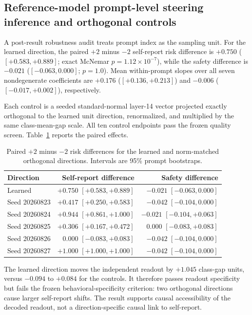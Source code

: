 \documentclass{article}
\begin{document}
\subsection{Reference-model prompt-level steering inference and orthogonal controls}
\label{app:steering-controls}

A post-result robustness audit treats prompt index as the sampling unit.
For the learned direction, the paired $+2$ minus $-2$ self-report risk difference
is $+0.750$ ($[+0.583,+0.889]$; exact McNemar $p=1.12\times10^{-7}$), while the
safety difference is $-0.021$ ($[-0.063,0.000]$; $p=1.0$). Mean within-prompt
slopes over all seven nondegenerate coefficients are $+0.176$
($[+0.136,+0.213]$) and $-0.006$ ($[-0.017,+0.002]$), respectively.

Each control is a seeded standard-normal layer-14 vector projected exactly
orthogonal to the learned unit direction, renormalized, and multiplied by the
same class-mean-gap scale. All ten control endpoints pass the frozen quality
screen. Table~\ref{tab:steering-controls} reports the paired effects.

\begin{table}[h]
  \caption{Paired $+2$ minus $-2$ risk differences for the learned and
  norm-matched orthogonal directions. Intervals are 95\% prompt bootstraps.}
  \label{tab:steering-controls}
  \centering
  \small
  \begin{tabular}{lrr}
    \toprule
    Direction & Self-report difference & Safety difference \\
    \midrule
    Learned & $+0.750$ $[+0.583,+0.889]$ & $-0.021$ $[-0.063,0.000]$ \\
    Seed 20260823 & $+0.417$ $[+0.250,+0.583]$ & $-0.042$ $[-0.104,0.000]$ \\
    Seed 20260824 & $+0.944$ $[+0.861,+1.000]$ & $-0.021$ $[-0.104,+0.063]$ \\
    Seed 20260825 & $+0.306$ $[+0.167,+0.472]$ & $0.000$ $[-0.083,+0.083]$ \\
    Seed 20260826 & $0.000$ $[-0.083,+0.083]$ & $-0.042$ $[-0.104,0.000]$ \\
    Seed 20260827 & $+1.000$ $[+1.000,+1.000]$ & $-0.042$ $[-0.104,0.000]$ \\
    \bottomrule
  \end{tabular}
\end{table}

The learned direction moves the independent readout by $+1.045$ class-gap
units, versus $-0.094$ to $+0.084$ for the controls. It therefore passes
readout specificity but fails the frozen behavioral-specificity criterion:
two orthogonal directions cause larger self-report shifts. The result supports
causal accessibility of the decoded readout, not a direction-specific causal
link to self-report.
\end{document}
